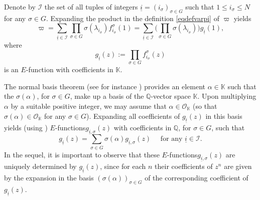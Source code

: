 \documentclass[JEP,XML,SOM,Unicode,published]{cedram}
\newcommand{\Efunction}{$E$\nobreakdash-func\-tion\xspace}
\newcommand{\Efunctions}{$E$\nobreakdash-func\-tions\xspace}
\theoremstyle{definition}
\newcommand{\Q}{\mathbb{Q}}
\newcommand{\K}{\mathbb{K}}
\newcommand{\Ok}{{\mathcal O}_{\K}}
\newcommand{\calI}{\mathcal I}
\newcommand{\isoul}{{\underline{i}}}
\begin{document}
Denote by $\calI $ the set of all tuples of integers $\isoul = (i_\sigma)_{\sigma\in G}$ such that $1 \leq i_\sigma \leq N$ for any $\sigma\in G$. Expanding the product in the definition \eqref{eqdefvarpi} of $\varpi$ yields
\begin{equation} \label{eqdefvp}
\varpi = \sum_{\isoul\in\calI}
\prod_{\sigma\in G} \sigma(\lambda_{i_\sigma}) f_{i_\sigma}^\sigma(1)
= \sum_{\isoul\in\calI}
\Big( \prod_{\sigma\in G} \sigma(\lambda_{i_\sigma})\Big) g_\isoul(1),
\end{equation}
where
\begin{equation} \label{eqdefgi}
g_\isoul(z) := \prod_{\sigma\in G} f_{i_\sigma}^\sigma(z)
\end{equation}
is an \Efunction with coefficients in $\K$.

The normal basis theorem (see for instance \cite[Th.\,5.18]{Milne}) provides an element $\alpha\in\K$ such that the $\sigma(\alpha)$, for $\sigma\in G$, make up a basis of the $\Q$-vector space $\K$. Upon multiplying $\alpha$ by a suitable positive integer, we may assume that $\alpha\in\Ok$ (so that $\sigma(\alpha)\in\Ok$ for any $\sigma\in G$). Expanding all coefficients of $ g_\isoul(z)$ in this basis yields (using \cite[Ch.\,3, Lem.\,12]{Shidlovskiilivre}) \Efunctions $ g_{\isoul,\sigma}(z)$ with coefficients in $\Q$, for $\sigma\in G$, such that
\begin{equation} \label{eqdcpgi}
g_\isoul(z) = \sum_{\sigma\in G} \sigma(\alpha)g_{\isoul,\sigma}(z)
\quad \mbox{ for any } \isoul\in\calI.
\end{equation}
In the sequel, it is important to observe that these \Efunctions $ g_{\isoul,\sigma}(z)$ are uniquely determined by $ g_\isoul(z)$, since for each $n$ their coefficients of $z^n$ are given by the expansion in the basis $(\sigma(\alpha))_{\sigma\in G}$ of the corresponding coefficient of $ g_\isoul(z)$.
\end{document}
